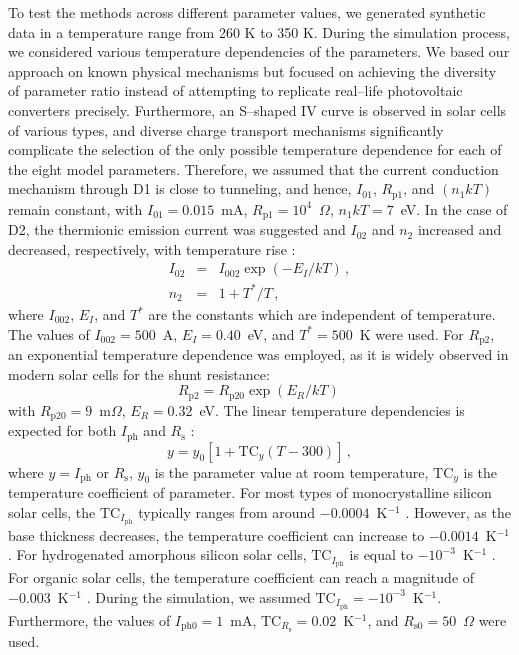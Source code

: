 \documentclass[a4paper,fleqn]{cas-sc}
\begin{document}
To test the methods across different parameter values, we generated synthetic data in a temperature range from 260 K to 350 K.
During the simulation process, we considered various temperature dependencies of the parameters.
We based our approach on known physical mechanisms but focused on achieving the diversity of parameter ratio
instead of attempting to replicate real--life photovoltaic converters precisely.
Furthermore, an S--shaped IV curve is observed in solar cells of various types,
and diverse charge transport mechanisms significantly complicate the selection of
the only possible temperature dependence for each of the eight model parameters.
Therefore, we assumed that the current conduction mechanism through D1 is close to tunneling,
and hence, $I_{01}$, $R_\mathrm{p1}$, and $(n_1kT)$ remain constant,
with $I_{01}=0.015$~mA, $R_\mathrm{p1}=10^4$~$\Omega$, $n_1kT=7$~eV.
In the case of D2, the thermionic emission current was suggested
and $I_{02}$ and $n_2$ increased and decreased, respectively, with temperature rise \cite{Sze2012}:
\begin{eqnarray}
I_{02}&=& I_{002}\exp\left(-E_I/kT\right)\,,\\
n_2&=&1+T^*/T\,,
\end{eqnarray}
where $I_{002}$, $E_I$, and $T^*$ are the constants which are independent of temperature.
The values of $I_{002}=500$~A, $E_I=0.40$~eV, and $T^*=500$~K were used.
For $R_\mathrm{p2}$, an exponential temperature dependence was employed,
as it is widely observed \cite{Kondratenko2019} in modern solar cells for the shunt resistance:
\begin{equation}
R_\mathrm{p2}=R_\mathrm{p20}\exp\left(E_R/kT\right)\,
\end{equation}
with
$R_\mathrm{p20}=9$~m$\Omega$,
$E_R=0.32$~eV.
The linear temperature dependencies is expected for both $I_\mathrm{ph}$ \cite{Green2003,Eberle2021} and $R_\mathrm{s}$ \cite{Ibrahim2017,Bradaschia2019}:
\begin{equation}
y=y_{0}[1+\mathrm{TC}_y(T-300)]\,,
\end{equation}
where
$y=I_\mathrm{ph}$ or $R_\mathrm{s}$,
$y_0$ is the parameter value at room temperature,
$\mathrm{TC}_y$ is the temperature coefficient of parameter.
For most types of monocrystalline silicon solar cells, the $\mathrm{TC}_{I_\mathrm{ph}}$ typically ranges from around $-0.0004$~K$^{-1}$ \cite{TuanLe2021}.
However, as the base thickness decreases, the temperature coefficient can increase to $-0.0014$~K$^{-1}$ \cite{Dupre2016}.
For hydrogenated amorphous silicon solar cells, $\mathrm{TC}_{I_\mathrm{ph}}$ is equal to $-10^{-3}$~K$^{-1}$ \cite{Riesen2016}.
For organic solar cells, the temperature coefficient can reach a magnitude of $-0.003$~K$^{-1}$ \cite{Rana2018}.
During the simulation, we assumed $\mathrm{TC}_{I_\mathrm{ph}}=-10^{-3}$~K$^{-1}$.
Furthermore, the values of $I_\mathrm{ph0}=1$~mA,
$\mathrm{TC}_{R_\mathrm{s}}=0.02$~K$^{-1}$,
and $R_\mathrm{s0}=50$~$\Omega$ were used.
\end{document}
